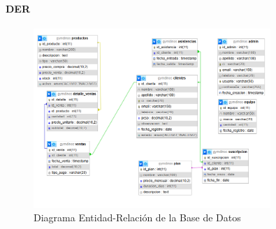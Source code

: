 \documentclass[12pt, letterpaper]{article}
\begin{document}
\paragraph{DER}
\begin{figure}[h]
\centering
\includegraphics[width=0.8\textwidth]{der.png}
\caption{Diagrama Entidad-Relación de la Base de Datos}
\label{fig:der}
\end{figure}
\newpage
\end{document}
